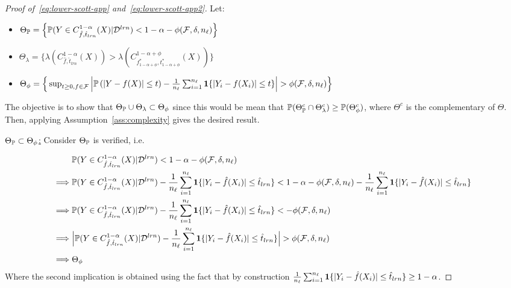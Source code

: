     \begin{proof}[Proof of~\eqref{eq:lower-scott-app} and~\eqref{eq:lower-scott-app2}]
        Let:
        \begin{itemize}
            \item $\Theta_{\mathbb{P}}=\Big\{{\mathbb{P}}(Y\in C_{\hat{f},\hat{t}_{lrn}}^{1-\alpha}(X)|{\cal D}^{lrn})< 1-\alpha - {\phi(\mathcal{F},\delta,n_\ell)}\Big\}$
            \item $\Theta_\lambda=\Big\{\lambda\left(C_{\hat{f},\hat{t}_{lrn}}^{1-\alpha}(X)\right) > \lambda\left(C_{f_{1-\alpha+\phi}^*,t_{1-\alpha+\phi}^*}^{1-\alpha + \phi}(X)\right)\Big\}$
            \item $\Theta_\phi=\Big\{\sup_{t\geq 0, f\in\calF}\Big|\IP\left(|Y-f(X)|\leq t\right) - \frac{1}{n_\ell}\sum_{i=1}^{n_\ell}\1\{|Y_i-f(X_i)|\leq t\}\Big|> \phiFl\Big\}$
        \end{itemize}

    The objective is to show that $\Theta_{\mathbb{P}}\cup\Theta_\lambda \subset \Theta_\phi$ since this would be mean that ${\mathbb{P}}(\Theta^c_{\mathbb{P}}\cap\Theta^c_\lambda)\geq {\mathbb{P}}(\Theta^c_\phi)$, where $\Theta^c$ is the complementary of $\Theta$. Then, applying Assumption~\ref{ass:complexity} gives the desired result.

    \underline{$\Theta_{\mathbb{P}}\subset  \Theta_\phi$:} Consider $\Theta_{\mathbb{P}}$ is verified, i.e.

    \begin{align*}
        & {\mathbb{P}}(Y\in C_{\hat{f},\hat{t}_{lrn}}^{1-\alpha}(X)|{\cal D}^{lrn})< 1-\alpha - {\phi(\mathcal{F},\delta,n_\ell)} \\
        \Longrightarrow \hspace{0.1cm}& {\mathbb{P}}(Y\in C_{\hat{f},\hat{t}_{lrn}}^{1-\alpha}(X)|{\cal D}^{lrn})- \frac{1}{n_\ell}\sum_{i=1}^{n_\ell}\mathbf{1}\{|Y_i-\hat{f}(X_i)|\leq \hat{t}_{lrn}\}< 1-\alpha - {\phi(\mathcal{F},\delta,n_\ell)} - \frac{1}{n_\ell}\sum_{i=1}^{n_\ell}\mathbf{1}\{|Y_i-\hat{f}(X_i)|\leq \hat{t}_{lrn}\}\\
        \Longrightarrow\hspace{0.1cm} & {\mathbb{P}}(Y\in C_{\hat{f},\hat{t}_{lrn}}^{1-\alpha}(X)|{\cal D}^{lrn})- \frac{1}{n_\ell}\sum_{i=1}^{n_\ell}\mathbf{1}\{|Y_i-\hat{f}(X_i)|\leq \hat{t}_{lrn}\}< - {\phi(\mathcal{F},\delta,n_\ell)}\\
        \Longrightarrow \hspace{0.1cm}& \Big|{\mathbb{P}}(Y\in C_{\hat{f},\hat{t}_{lrn}}^{1-\alpha}(X)|{\cal D}^{lrn})- \frac{1}{n_\ell}\sum_{i=1}^{n_\ell}\mathbf{1}\{|Y_i-\hat{f}(X_i)|\leq \hat{t}_{lrn}\}\Big| > {\phi(\mathcal{F},\delta,n_\ell)} \\
        \Longrightarrow \hspace{0.1cm}& \Theta_\phi
    \end{align*}
    Where the second implication is obtained using the fact that by construction $\frac{1}{n_\ell}\sum_{i=1}^{n_\ell}\mathbf{1}\{|Y_i-\hat{f}(X_i)|\leq \hat{t}_{lrn}\} \geq 1-\alpha$.
    

\end{proof}
